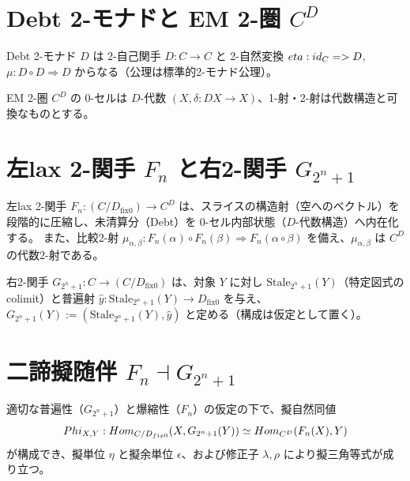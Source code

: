 \documentclass[a4paper,11pt]{article}
\begin{document}
\section{Debt 2-モナドと EM 2-圏 \texorpdfstring{$C^D$}{C\string^D}}
\begin{definition}
Debt 2-モナド $D$ は 2-自己関手 $D:C\to C$ と 2-自然変換 $eta:id_C=> D$, $\mu:D\circ D\Rightarrow D$ からなる（公理は標準的2-モナド公理）。
\end{definition}

\begin{definition}[EM 2-圏]
EM 2-圏 $C^D$ の 0-セルは $D$-代数 $(X,\delta:DX\to X)$、1-射・2-射は代数構造と可換なものとする。
\end{definition}

\section{左lax 2-関手 \texorpdfstring{$F_n$}{Fn} と右2-関手 \texorpdfstring{$G_{2^n+1}$}{G(2\string^n+1)}}
\begin{definition}[$F_n$（爆縮）]
左lax 2-関手 $F_n:(C/D_{\mathrm{fix}0})\to C^D$ は、スライスの構造射（空へのベクトル）を段階的に圧縮し、未清算分（Debt）を 0-セル内部状態（$D$-代数構造）へ内在化する。
また、比較2-射 $\mu_{\alpha,\beta}:F_n(\alpha)\circ F_n(\beta)\Rightarrow F_n(\alpha\circ\beta)$ を備え、$\mu_{\alpha,\beta}$ は $C^D$ の代数2-射である。
\end{definition}

\begin{definition}[$G_{2^n+1}$（奇数すくみ）]
右2-関手 $G_{2^n+1}:C\to (C/D_{\mathrm{fix}0})$ は、対象 $Y$ に対し $\mathrm{Stale}_{2^n+1}(Y)$（特定図式の colimit）と普遍射 $\hat y:\mathrm{Stale}_{2^n+1}(Y)\to D_{\mathrm{fix}0}$ を与え、
$G_{2^n+1}(Y):=(\mathrm{Stale}_{2^n+1}(Y),\hat y)$ と定める（構成は仮定として置く）。
\end{definition}

\section{二諦擬随伴 \texorpdfstring{$F_n \dashv G_{2^n+1}$}{Fn dashv G(2^n+1)}}
\begin{theorem}
適切な普遍性（$G_{2^n+1}$）と爆縮性（$F_n$）の仮定の下で、擬自然同値
\[
Phi_{X,Y}:Hom_{C/D_{fix0}}(X,G_{2^n+1}(Y))\simeq Hom_{C^D}(F_n(X),Y)
\]
が構成でき、擬単位 $\eta$ と擬余単位 $\epsilon$、および修正子 $\lambda,\rho$ により擬三角等式が成り立つ。
\end{theorem}
\end{document}
